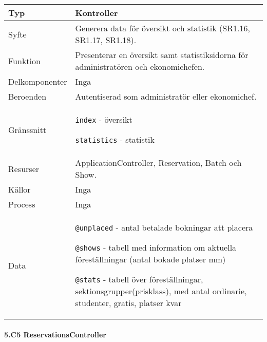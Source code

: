 \documentclass[a4paper, twoside, 11pt, titlepage]{article}
\begin{document}
			\begin {table} [ht] \begin{tabular} {  p{3.5cm} p{9.6cm} }
				\hline
				{Typ} & {Kontroller} \\
				\hline
				{Syfte} & {Generera data för översikt och statistik (SR1.16, SR1.17, SR1.18).} \\
				\hline
				{Funktion} & {Presenterar en översikt samt statistiksidorna för administratören och ekonomichefen.} \\
				\hline
				{Delkomponenter} & {Inga} \\
				\hline
				{Beroenden} & {Autentiserad som administratör eller ekonomichef.} \\
				\hline
				{Gränssnitt} & {{\tt index} - översikt

{\tt statistics} - statistik} \\
				\hline
				{Resurser} & {ApplicationController, Reservation, Batch och Show.} \\
				\hline
				{Källor} & {Inga} \\
				\hline
				{Process} & {Inga} \\
				\hline
				{Data} & {{\tt @unplaced} - antal betalade bokningar att placera

{\tt @shows} - tabell med information om aktuella föreställningar (antal bokade platser mm)

{\tt @stats} - tabell över föreställningar, sektionsgrupper(prisklass), med antal ordinarie, studenter, gratis, platser kvar} \\
				\hline
			\end{tabular} \end{table} \FloatBarrier


			\paragraph{5.C5 ReservationsController}\
\end{document}
